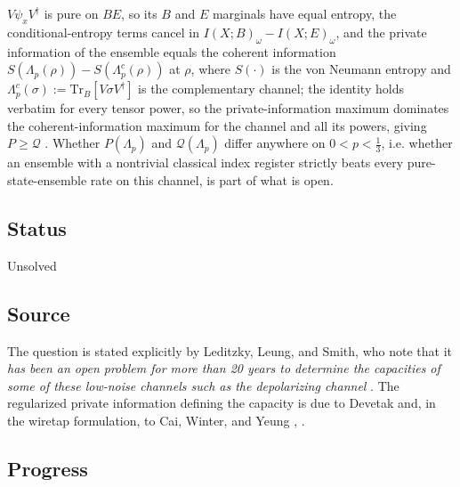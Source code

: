 $V\psi_xV^\dagger$ is pure on $BE$, so its $B$ and $E$ marginals have equal
entropy, the conditional-entropy terms cancel in
$I(X;B)_\omega-I(X;E)_\omega$, and the private information of the ensemble
equals the coherent information $S(\Lambda_p(\rho))-S(\Lambda_p^{c}(\rho))$
at $\rho$, where $S(\cdot)$ is the von Neumann entropy and
$\Lambda_p^{c}(\sigma):=\mathrm{Tr}_B[V\sigma V^\dagger]$ is the
complementary channel; the identity holds verbatim for every tensor power,
so the private-information maximum dominates the coherent-information
maximum for the channel and all its powers, giving $P\ge\mathcal Q$
.  Whether $P(\Lambda_p)$ and
$\mathcal Q(\Lambda_p)$ differ anywhere on $0<p<\tfrac{1}{3}$, i.e. whether
an ensemble with a nontrivial classical index register strictly beats every
pure-state-ensemble rate on this channel, is part of what is open.

\subsection*{Status}

Unsolved

\subsection*{Source}

The question is stated explicitly by Leditzky, Leung, and Smith, who note that
it \emph{has been an open problem for more than 20 years to determine the
capacities of some of these low-noise channels such as the depolarizing
channel} .  The regularized
private information defining the capacity is due to Devetak and, in the
wiretap formulation, to Cai, Winter, and Yeung
,
.

\subsection*{Progress}

